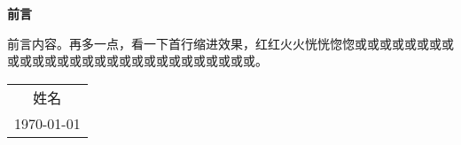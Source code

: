 \maketitle

\setcounter{page}{1}

\begin{center}
    \Huge\textbf{前言}
\end{center}

前言内容。再多一点，看一下首行缩进效果，红红火火恍恍惚惚或或或或或或或或或或或或或或或或或或或或或或或或或或或或。

\begin{flushright}
    \begin{tabular}{c}
        姓名\\
        \today
    \end{tabular}
\end{flushright}

\newpage

\setcounter{page}{1}

\tableofcontents

\newpage

\setcounter{page}{1}
